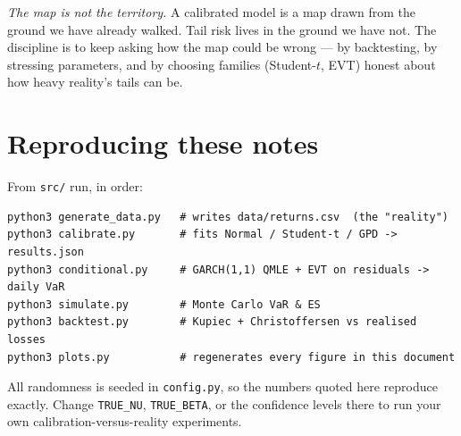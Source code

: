 \documentclass[11pt]{article}
\begin{document}
\noindent \emph{The map is not the territory.} A calibrated model is a map
drawn from the ground we have already walked. Tail risk lives in the ground we
have not. The discipline is to keep asking how the map could be wrong --- by
backtesting, by stressing parameters, and by choosing families (Student-$t$,
EVT) honest about how heavy reality's tails can be.

\appendix
\section{Reproducing these notes}
From \texttt{src/} run, in order:
\begin{verbatim}
python3 generate_data.py   # writes data/returns.csv  (the "reality")
python3 calibrate.py       # fits Normal / Student-t / GPD -> results.json
python3 conditional.py     # GARCH(1,1) QMLE + EVT on residuals -> daily VaR
python3 simulate.py        # Monte Carlo VaR & ES
python3 backtest.py        # Kupiec + Christoffersen vs realised losses
python3 plots.py           # regenerates every figure in this document
\end{verbatim}
All randomness is seeded in \texttt{config.py}, so the numbers quoted here
reproduce exactly. Change \texttt{TRUE\_NU}, \texttt{TRUE\_BETA}, or the
confidence levels there to run your own calibration-versus-reality experiments.
\end{document}
